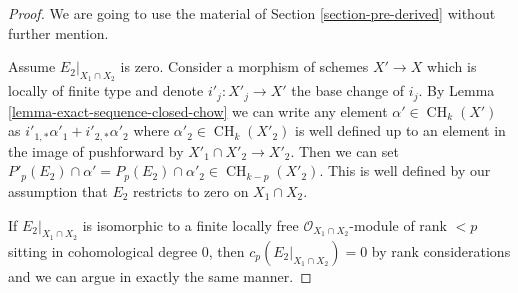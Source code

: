 \documentclass[10pt,a4paper]{amsart}
\theoremstyle{plain}
\theoremstyle{definition}
\theoremstyle{remark}
\numberwithin{equation}{subsection}
\def\CH{\mathop{\mathrm{CH}}\nolimits}
\begin{document}
\begin{proof}
We are going to use the material of Section \ref{section-pre-derived}
without further mention.

\medskip\noindent
Assume $E_2|_{X_1 \cap X_2}$ is zero.
Consider a morphism of schemes $X' \to X$
which is locally of finite type and denote $i'_j : X'_j \to X'$ the
base change of $i_j$. By Lemma \ref{lemma-exact-sequence-closed-chow}
we can write any element $\alpha' \in \CH_k(X')$ as
$i'_{1, *}\alpha'_1 + i'_{2, *}\alpha'_2$ where
$\alpha'_2 \in \CH_k(X'_2)$
is well defined up to an element in the image of pushforward
by $X'_1 \cap X'_2 \to X'_2$. Then we can set
$P'_p(E_2) \cap \alpha' = P_p(E_2) \cap \alpha'_2 \in \CH_{k - p}(X'_2)$. This
is well defined by our assumption that $E_2$ restricts
to zero on $X_1 \cap X_2$.

\medskip\noindent
If $E_2|_{X_1 \cap X_2}$ is isomorphic to a finite locally free
$\mathcal{O}_{X_1 \cap X_2}$-module of rank $< p$ sitting in
cohomological degree $0$, then $c_p(E_2|_{X_1 \cap X_2}) = 0$
by rank considerations and we can argue in exactly the same manner.
\end{proof}
\end{document}
